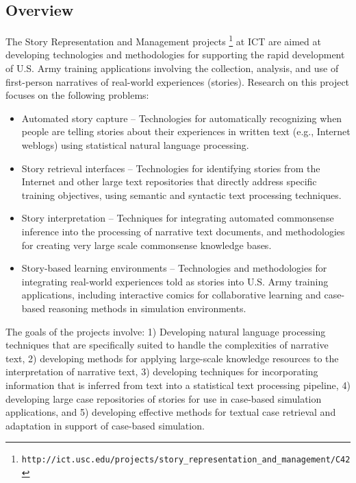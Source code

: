 \documentclass{article}[12pt]
\newcommand\url[1]{\texttt{#1}}
\begin{document}
\subsection{Overview}

The Story Representation and Management projects
\footnote{\url{http://ict.usc.edu/projects/story\_representation\_and\_management/C42}}
at ICT are aimed at developing technologies and methodologies for supporting
the rapid development of U.S.  Army training applications involving the
collection, analysis, and use of first-person narratives of real-world
experiences (stories). Research on this project focuses on the following
problems: 

\begin{itemize} \item 
Automated story capture -- Technologies for
automatically recognizing when people are telling stories about their
experiences in written text (e.g., Internet weblogs) using statistical natural
language processing. \item Story retrieval interfaces -- Technologies for
identifying stories from the Internet and other large text repositories that
directly address specific training objectives, using semantic and syntactic
text processing techniques.  \item Story interpretation -- Techniques for
integrating automated commonsense inference into the processing of narrative
text documents, and methodologies for creating very large scale commonsense
knowledge bases.  \item Story-based learning environments -- Technologies and
methodologies for integrating real-world experiences told as stories into U.S.
Army training applications, including interactive comics for collaborative
learning and case-based reasoning methods in simulation environments.
\end{itemize}

The goals of the projects involve: 1) Developing natural language processing
techniques that are specifically suited to handle the complexities of narrative
text, 2) developing methods for applying large-scale knowledge resources to the
interpretation of narrative text, 3) developing techniques for incorporating
information that is inferred from text into a statistical text processing
pipeline, 4) developing large case repositories of stories for use in
case-based simulation applications, and 5) developing effective methods for
textual case retrieval and adaptation in support of case-based simulation.
\end{document}
